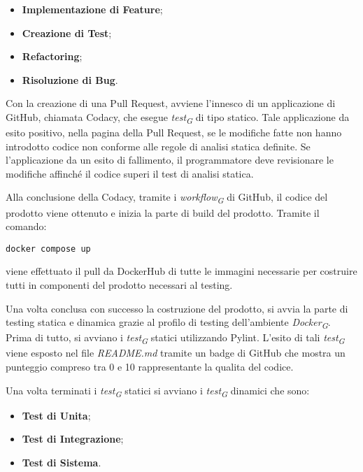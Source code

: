 \begin{itemize}
    \item \textbf{Implementazione di Feature};
    \item \textbf{Creazione di Test};
    \item \textbf{Refactoring};
    \item \textbf{Risoluzione di Bug}.
\end{itemize}

Con la creazione di una Pull Request, avviene l'innesco di un applicazione di GitHub, chiamata Codacy, che esegue \textit{test}\textsubscript{\textit{G}} di tipo statico. Tale applicazione da esito positivo, nella pagina della Pull Request, se le modifiche fatte non hanno introdotto codice non conforme alle regole di analisi statica definite. Se l'applicazione da un esito di fallimento, il programmatore deve revisionare le modifiche affinché il codice superi il test di analisi statica.

\vspace{0.2cm}

Alla conclusione della Codacy, tramite i \textit{workflow}\textsubscript{\textit{G}} di GitHub, il codice del prodotto viene ottenuto e inizia la parte di build del prodotto. Tramite il comando:
\begin{lstlisting}[style=code]
    docker compose up
\end{lstlisting}
viene effettuato il pull da DockerHub di tutte le immagini necessarie per costruire tutti in componenti del prodotto necessari al testing.

\vspace{0.2cm}

Una volta conclusa con successo la costruzione del prodotto, si avvia la parte di testing statica e dinamica grazie al profilo di testing dell'ambiente \textit{Docker}\textsubscript{\textit{G}}. Prima di tutto, si avviano i \textit{test}\textsubscript{\textit{G}} statici utilizzando Pylint. L'esito di tali \textit{test}\textsubscript{\textit{G}} viene esposto nel file \textit{README.md} tramite un badge di GitHub che mostra un punteggio compreso tra 0 e 10 rappresentante la qualita del codice.


\vspace{0.2cm}

Una volta terminati i \textit{test}\textsubscript{\textit{G}} statici si avviano i \textit{test}\textsubscript{\textit{G}} dinamici che sono:

\begin{itemize}
    \item \textbf{Test di Unita};
    \item \textbf{Test di Integrazione};
    \item \textbf{Test di Sistema}.
\end{itemize}

